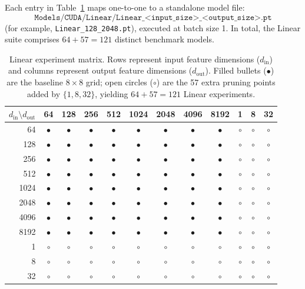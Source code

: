 Each entry in Table~\ref{tab:linear-matrix} maps one-to-one to a standalone model file:
$$
\texttt{Models/CUDA/Linear/Linear\_<input\_size>\_<output\_size>.pt}
$$
(for example, \texttt{Linear\_128\_2048.pt}), executed at batch size 1. In total, the Linear suite comprises $64 + 57 = 121$ distinct benchmark models.

\begin{table}
    \centering
    \setlength{\tabcolsep}{3.5pt}
    \begin{tabular}{r|*{8}{c}|*{3}{c}}
        \hline
        \textbf{$d_{\text{in}}\!\setminus\!d_{\text{out}}$} & \textbf{64} & \textbf{128} & \textbf{256} &
        \textbf{512} & \textbf{1024} & \textbf{2048} & \textbf{4096} &
        \textbf{8192} & \textbf{1} & \textbf{8} & \textbf{32} \\
        \hline
        64   & $\bullet$ & $\bullet$ & $\bullet$ & $\bullet$ & $\bullet$ & $\bullet$ & $\bullet$ & $\bullet$ & $\circ$ & $\circ$ & $\circ$ \\
        128  & $\bullet$ & $\bullet$ & $\bullet$ & $\bullet$ & $\bullet$ & $\bullet$ & $\bullet$ & $\bullet$ & $\circ$ & $\circ$ & $\circ$ \\
        256  & $\bullet$ & $\bullet$ & $\bullet$ & $\bullet$ & $\bullet$ & $\bullet$ & $\bullet$ & $\bullet$ & $\circ$ & $\circ$ & $\circ$ \\
        512  & $\bullet$ & $\bullet$ & $\bullet$ & $\bullet$ & $\bullet$ & $\bullet$ & $\bullet$ & $\bullet$ & $\circ$ & $\circ$ & $\circ$ \\
        1024 & $\bullet$ & $\bullet$ & $\bullet$ & $\bullet$ & $\bullet$ & $\bullet$ & $\bullet$ & $\bullet$ & $\circ$ & $\circ$ & $\circ$ \\
        2048 & $\bullet$ & $\bullet$ & $\bullet$ & $\bullet$ & $\bullet$ & $\bullet$ & $\bullet$ & $\bullet$ & $\circ$ & $\circ$ & $\circ$ \\
        4096 & $\bullet$ & $\bullet$ & $\bullet$ & $\bullet$ & $\bullet$ & $\bullet$ & $\bullet$ & $\bullet$ & $\circ$ & $\circ$ & $\circ$ \\
        8192 & $\bullet$ & $\bullet$ & $\bullet$ & $\bullet$ & $\bullet$ & $\bullet$ & $\bullet$ & $\bullet$ & $\circ$ & $\circ$ & $\circ$ \\
        \hline
        1    & $\circ$ & $\circ$ & $\circ$ & $\circ$ & $\circ$ & $\circ$ & $\circ$ & $\circ$ & $\circ$ & $\circ$ & $\circ$ \\
        8    & $\circ$ & $\circ$ & $\circ$ & $\circ$ & $\circ$ & $\circ$ & $\circ$ & $\circ$ & $\circ$ & $\circ$ & $\circ$ \\
        32   & $\circ$ & $\circ$ & $\circ$ & $\circ$ & $\circ$ & $\circ$ & $\circ$ & $\circ$ & $\circ$ & $\circ$ & $\circ$ \\
        \hline
    \end{tabular}
    \caption{Linear experiment matrix. Rows represent input feature dimensions ($d_{\text{in}}$) and columns represent output feature dimensions ($d_{\text{out}}$). Filled bullets ($\bullet$) are the baseline $8 \times 8$ grid; open circles ($\circ$) are the 57 extra pruning points added by $\{1, 8, 32\}$, yielding $64+57=121$ Linear experiments.}
    \label{tab:linear-matrix}
\end{table}

